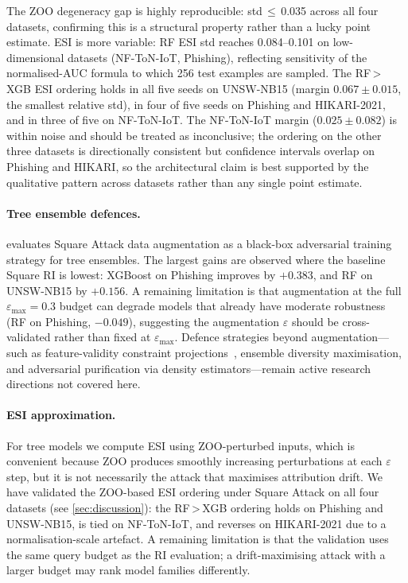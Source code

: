 \documentclass[runningheads]{llncs}
\begin{document}
The ZOO degeneracy gap is highly reproducible: std\,$\leq$\,0.035 across all
four datasets, confirming this is a structural property rather than a lucky
point estimate.  ESI is more variable: RF ESI std reaches 0.084--0.101 on
low-dimensional datasets (NF-ToN-IoT, Phishing), reflecting sensitivity of the
normalised-AUC formula to which 256 test examples are sampled.  The RF\,>\,XGB
ESI ordering holds in all five seeds on UNSW-NB15 (margin $0.067 \pm 0.015$,
the smallest relative std), in four of five seeds on Phishing and HIKARI-2021,
and in three of five on NF-ToN-IoT.  The NF-ToN-IoT margin ($0.025 \pm 0.082$)
is within noise and should be treated as inconclusive; the ordering on the other
three datasets is directionally consistent but confidence intervals overlap on
Phishing and HIKARI, so the architectural claim is best supported by the
qualitative pattern across datasets rather than any single point estimate.

\paragraph{Tree ensemble defences.}
 evaluates Square Attack data augmentation as a
black-box adversarial training strategy for tree ensembles.  The largest gains
are observed where the baseline Square RI is lowest: XGBoost on Phishing
improves by $+0.383$, and RF on UNSW-NB15 by $+0.156$.  A remaining limitation
is that augmentation at the full $\varepsilon_{\max}=0.3$ budget can degrade
models that already have moderate robustness (RF on Phishing, $-0.049$), suggesting
the augmentation $\varepsilon$ should be cross-validated rather than fixed at
$\varepsilon_{\max}$.  Defence strategies beyond augmentation---such as
feature-validity constraint projections~\cite{apruzzese2022modeling}, ensemble
diversity maximisation, and adversarial purification via density estimators---remain
active research directions not covered here.

\paragraph{ESI approximation.}
For tree models we compute ESI using ZOO-perturbed inputs, which is convenient
because ZOO produces smoothly increasing perturbations at each $\varepsilon$
step, but it is not necessarily the attack that maximises attribution drift.
We have validated the ZOO-based ESI ordering under Square Attack on all four
datasets (see \cref{sec:discussion}): the RF\,>\,XGB ordering holds on Phishing
and UNSW-NB15, is tied on NF-ToN-IoT, and reverses on HIKARI-2021 due to a
normalisation-scale artefact.  A remaining limitation is that the validation
uses the same query budget as the RI evaluation; a drift-maximising attack
with a larger budget may rank model families differently.
\end{document}
